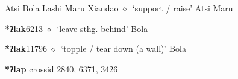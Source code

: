 \begin{list}{}{\leftmargin=1.5em \itemindent=-1.5em}
\hspace{1ex}
         Atsi 
\hspace{1ex}
         Bola 
\hspace{1ex}
         Lashi 
\hspace{1ex}
         Maru 
\hspace{1ex}
         Xiandao 
\hspace{1ex}
         $\diamond$~`support / raise'
         Atsi 
\hspace{1ex}
         Maru 
  \item {\footnotesize \textbf{*ʔlak}}{\tiny 6213}
\hspace{1ex}
         $\diamond$~`leave sthg. behind'
         Bola 
  \item {\footnotesize \textbf{*ʔlak}}{\tiny 11796}
\hspace{1ex}
         $\diamond$~`topple / tear down (a wall)'
         Bola 
  \end{list}
\item
\textbf{*ʔlap}
  {\tiny crossid 2840, 6371, 3426}
